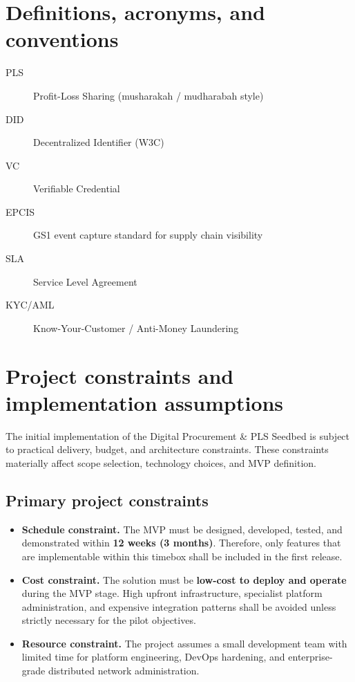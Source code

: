\documentclass[11pt,a4paper]{article}
\begin{document}
\section{Definitions, acronyms, and conventions}
\begin{description}
\item[PLS] Profit-Loss Sharing (musharakah / mudharabah style)
\item[DID] Decentralized Identifier (W3C)
\item[VC] Verifiable Credential
\item[EPCIS] GS1 event capture standard for supply chain visibility
\item[SLA] Service Level Agreement
\item[KYC/AML] Know-Your-Customer / Anti-Money Laundering
\end{description}

\section{Project constraints and implementation assumptions}
\label{sec:constraints}

The initial implementation of the Digital Procurement \& PLS Seedbed is subject to practical delivery, budget, and architecture constraints. These constraints materially affect scope selection, technology choices, and MVP definition.

\subsection{Primary project constraints}
\begin{itemize}
\item \textbf{Schedule constraint.} The MVP must be designed, developed, tested, and demonstrated within \textbf{12 weeks (3 months)}. Therefore, only features that are implementable within this timebox shall be included in the first release.
\item \textbf{Cost constraint.} The solution must be \textbf{low-cost to deploy and operate} during the MVP stage. High upfront infrastructure, specialist platform administration, and expensive integration patterns shall be avoided unless strictly necessary for the pilot objectives.
\item \textbf{Resource constraint.} The project assumes a small development team with limited time for platform engineering, DevOps hardening, and enterprise-grade distributed network administration.
\end{itemize}
\end{document}
